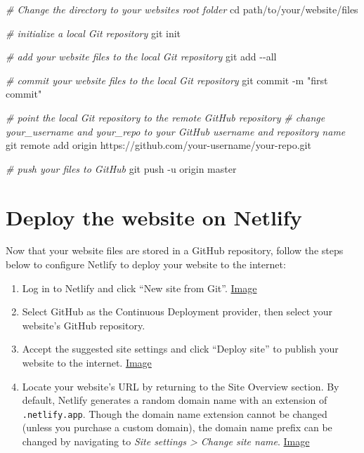 \documentclass[
]{book}
\newenvironment{Shaded}{\begin{snugshade}}{\end{snugshade}}
\newcommand{\AttributeTok}[1]{\textcolor[rgb]{0.77,0.63,0.00}{#1}}
\newcommand{\BuiltInTok}[1]{#1}
\newcommand{\CommentTok}[1]{\textcolor[rgb]{0.56,0.35,0.01}{\textit{#1}}}
\newcommand{\FunctionTok}[1]{\textcolor[rgb]{0.00,0.00,0.00}{#1}}
\newcommand{\NormalTok}[1]{#1}
\newcommand{\StringTok}[1]{\textcolor[rgb]{0.31,0.60,0.02}{#1}}
\begin{document}
\begin{Shaded}
\begin{Highlighting}[]
\CommentTok{\# Change the directory to your website\textquotesingle{}s root folder}
\BuiltInTok{cd}\NormalTok{ path/to/your/website/files}

\CommentTok{\# initialize a local Git repository}
\FunctionTok{git}\NormalTok{ init}

\CommentTok{\# add your website files to the local Git repository}
\FunctionTok{git}\NormalTok{ add }\AttributeTok{{-}{-}all}

\CommentTok{\# commit your website files to the local Git repository}
\FunctionTok{git}\NormalTok{ commit }\AttributeTok{{-}m} \StringTok{"first commit"}

\CommentTok{\# point the local Git repository to the remote GitHub repository}
\CommentTok{\# change your\_username and your\_repo to your GitHub username and repository name}
\FunctionTok{git}\NormalTok{ remote add origin https://github.com/your{-}username/your{-}repo.git}

\CommentTok{\# push your files to GitHub}
\FunctionTok{git}\NormalTok{ push }\AttributeTok{{-}u}\NormalTok{ origin master}
\end{Highlighting}
\end{Shaded}

\hypertarget{demo-deploy}{%
\section{Deploy the website on Netlify}\label{demo-deploy}}

Now that your website files are stored in a GitHub repository, follow the steps below to configure Netlify to deploy your website to the internet:

\begin{enumerate}
\def\labelenumi{\arabic{enumi}.}
\item
  Log in to Netlify and click ``New site from Git''. \href{https://i.imgur.com/ztaGsN3.png}{Image}
\item
  Select GitHub as the Continuous Deployment provider, then select your website's GitHub repository.
\item
  Accept the suggested site settings and click ``Deploy site'' to publish your website to the internet. \href{https://i.imgur.com/wjDFnvJ.png}{Image}
\item
  Locate your website's URL by returning to the Site Overview section. By default, Netlify generates a random domain name with an extension of \texttt{.netlify.app}. Though the domain name extension cannot be changed (unless you purchase a custom domain), the domain name prefix can be changed by navigating to \emph{Site settings \textgreater{} Change site name}. \href{https://i.imgur.com/kiyzULE.png}{Image}
\end{enumerate}
\end{document}
